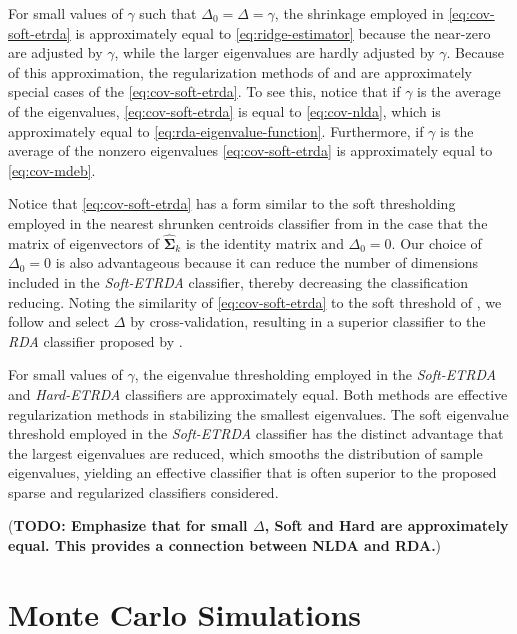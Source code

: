 \documentclass[11pt]{article}
\begin{document}
For small values of $\gamma$ such that $\Delta_0 = \Delta = \gamma$, the shrinkage employed in \eqref{eq:cov-soft-etrda} is approximately equal to \eqref{eq:ridge-estimator} because the near-zero are adjusted by $\gamma$, while the larger eigenvalues are hardly adjusted by $\gamma$. Because of this approximation, the regularization methods of \cite{Friedman:1989tm} and \cite{Srivastava:2007ww} are approximately special cases of the \eqref{eq:cov-soft-etrda}. To see this, notice that if $\gamma$ is the average of the eigenvalues, \eqref{eq:cov-soft-etrda} is equal to \eqref{eq:cov-nlda}, which is approximately equal to \eqref{eq:rda-eigenvalue-function}. Furthermore, if $\gamma$ is the average of the nonzero eigenvalues \eqref{eq:cov-soft-etrda} is approximately equal to \eqref{eq:cov-mdeb}.

Notice that \eqref{eq:cov-soft-etrda} has a form similar to the soft thresholding employed in the nearest shrunken centroids classifier from \cite{Tibshirani:2002ht} in the case that the matrix of eigenvectors of $\widehat{\bm \Sigma}_k$ is the identity matrix and $\Delta_0 = 0$. Our choice of $\Delta_0 = 0$ is also advantageous because it can reduce the number of dimensions included in the \emph{Soft-ETRDA} classifier, thereby decreasing the classification reducing. Noting the similarity of \eqref{eq:cov-soft-etrda} to the soft threshold of \cite{Tibshirani:2002ht}, we follow \cite{Tibshirani:2002ht} and select $\Delta$ by cross-validation, resulting in a superior classifier to the \emph{RDA} classifier proposed by \cite{Friedman:1989tm}.

For small values of $\gamma$, the eigenvalue thresholding employed in the \emph{Soft-ETRDA} and \emph{Hard-ETRDA} classifiers are approximately equal. Both methods are effective regularization methods in stabilizing the smallest eigenvalues. The soft eigenvalue threshold employed in the \emph{Soft-ETRDA} classifier has the distinct advantage that the largest eigenvalues are reduced, which smooths the distribution of sample eigenvalues, yielding an effective classifier that is often superior to the proposed sparse and regularized classifiers considered.

(\textbf{TODO: Emphasize that for small $\Delta$, Soft and Hard are approximately equal. This provides a connection between NLDA and RDA.})


\section{Monte Carlo Simulations}
\end{document}
